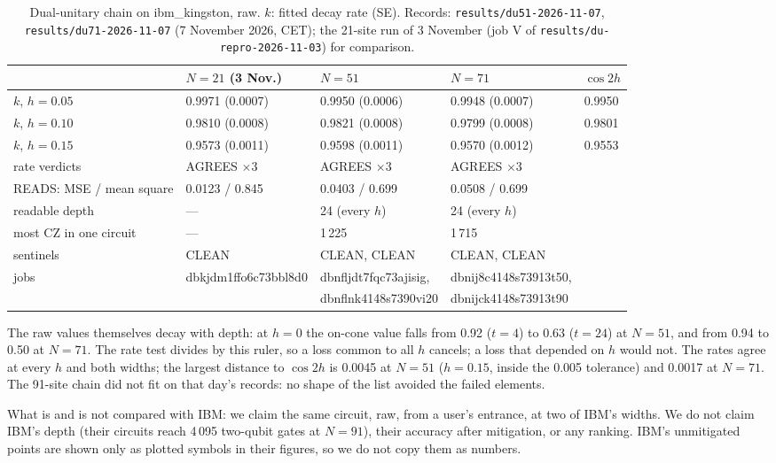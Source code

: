 \documentclass[10pt,a4paper]{article}
\begin{document}
\begin{table}[h]\centering\small
\caption{Dual-unitary chain on ibm\_kingston, raw. $k$: fitted decay rate (SE). Records:
\texttt{results/du51-2026-11-07}, \texttt{results/du71-2026-11-07} (7 November 2026, CET); the 21-site run of
3 November (job V of \texttt{results/du-repro-2026-11-03}) for comparison.}
\begin{tabular}{lllll}\toprule
 & $N = 21$ (3 Nov.) & $N = 51$ & $N = 71$ & $\cos 2h$ \\ \midrule
$k$, $h = 0.05$ & 0.9971 (0.0007) & 0.9950 (0.0006) & 0.9948 (0.0007) & 0.9950 \\
$k$, $h = 0.10$ & 0.9810 (0.0008) & 0.9821 (0.0008) & 0.9799 (0.0008) & 0.9801 \\
$k$, $h = 0.15$ & 0.9573 (0.0011) & 0.9598 (0.0011) & 0.9570 (0.0012) & 0.9553 \\
rate verdicts & AGREES $\times 3$ & AGREES $\times 3$ & AGREES $\times 3$ & \\
READS: MSE / mean square & 0.0123 / 0.845 & 0.0403 / 0.699 & 0.0508 / 0.699 & \\
readable depth & --- & 24 (every $h$) & 24 (every $h$) & \\
most CZ in one circuit & --- & 1\,225 & 1\,715 & \\
sentinels & CLEAN & CLEAN, CLEAN & CLEAN, CLEAN & \\
jobs & dbkjdm1ffo6c73bbl8d0 & dbnfljdt7fqc73ajisig, & dbnij8c4148s73913t50, & \\
 & & dbnflnk4148s7390vi20 & dbnijck4148s73913t90 & \\
\bottomrule\end{tabular}
\end{table}

The raw values themselves decay with depth: at $h = 0$ the on-cone value falls from 0.92 ($t = 4$) to 0.63
($t = 24$) at $N = 51$, and from 0.94 to 0.50 at $N = 71$. The rate test divides by this ruler, so a loss common to
all $h$ cancels; a loss that depended on $h$ would not. The rates agree at every $h$ and both widths; the largest
distance to $\cos 2h$ is 0.0045 at $N = 51$ ($h = 0.15$, inside the 0.005 tolerance) and 0.0017 at $N = 71$. The
91-site chain did not fit on that day's records: no shape of the list avoided the failed elements.

What is and is not compared with IBM: we claim the same circuit, raw, from a user's entrance, at two of IBM's widths.
We do not claim IBM's depth (their circuits reach 4\,095 two-qubit gates at $N = 91$), their accuracy after
mitigation, or any ranking. IBM's unmitigated points are shown only as plotted symbols in their figures, so we do not
copy them as numbers.
\end{document}
